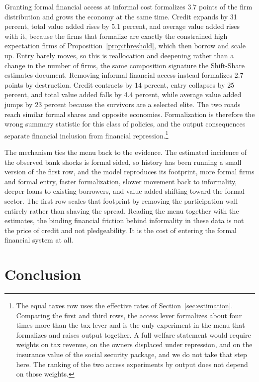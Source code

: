 \documentclass[12pt]{article}
\begin{document}
Granting formal financial access at informal cost formalizes 3.7 points of the firm distribution and grows the economy at the same time. Credit expands by 31 percent, total value added rises by 5.1 percent, and average value added rises with it, because the firms that formalize are exactly the constrained high expectation firms of Proposition~\ref{prop:threshold}, which then borrow and scale up. Entry barely moves, so this is reallocation and deepening rather than a change in the number of firms, the same composition signature the Shift-Share estimates document. Removing informal financial access instead formalizes 2.7 points by destruction. Credit contracts by 14 percent, entry collapses by 25 percent, and total value added falls by 4.4 percent, while average value added jumps by 23 percent because the survivors are a selected elite. The two roads reach similar formal shares and opposite economies. Formalization is therefore the wrong summary statistic for this class of policies, and the output consequences separate financial inclusion from financial repression.\footnote{The equal taxes row uses the effective rates of Section~\ref{sec:estimation}. Comparing the first and third rows, the access lever formalizes about four times more than the tax lever and is the only experiment in the menu that formalizes and raises output together. A full welfare statement would require weights on tax revenue, on the owners displaced under repression, and on the insurance value of the social security package, and we do not take that step here. The ranking of the two access experiments by output does not depend on those weights.}

The mechanism ties the menu back to the evidence. The estimated incidence of the observed bank shocks is formal sided, so history has been running a small version of the first row, and the model reproduces its footprint, more formal firms and formal entry, faster formalization, slower movement back to informality, deeper loans to existing borrowers, and value added shifting toward the formal sector. The first row scales that footprint by removing the participation wall entirely rather than shaving the spread. Reading the menu together with the estimates, the binding financial friction behind informality in these data is not the price of credit and not pledgeability. It is the cost of entering the formal financial system at all.

\section{Conclusion}
\label{11}
\end{document}
